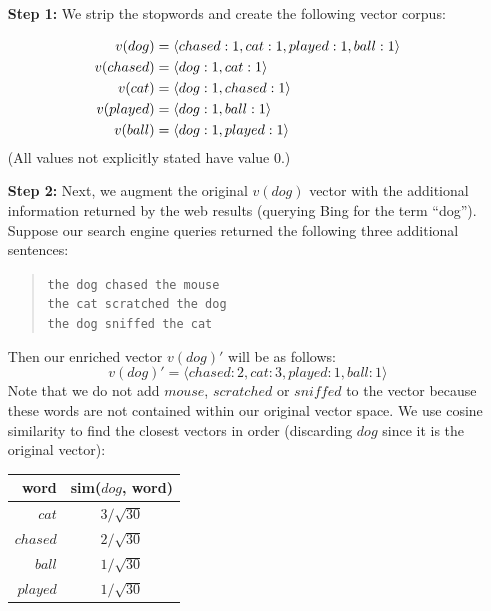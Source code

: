 \documentclass{article}
\begin{document}
\begin{enumerate}

\item[{\bf Step 1:}]
We strip the stopwords and create the following vector corpus:

\begin{align}
    v(dog) &=  \langle chased: 1, cat: 1, played: 1, ball: 1\rangle \notag\\ %
    v(chased)& = \langle dog: 1, cat: 1\rangle \notag\\  %
    v(cat) &=  \langle dog: 1, chased: 1\rangle \notag\\  %
    v(played) &=  \langle dog: 1, ball: 1\rangle \notag\\ %
    v(ball)& =  \langle dog: 1, played: 1\rangle  \notag  %
\end{align}
(All values not explicitly stated have value 0.)

\item[{\bf Step 2:}]
Next, we augment the original $v(dog)$ vector with the additional information returned by the web results (querying Bing for the term ``dog'').
Suppose our search engine queries returned the following three additional sentences:
\begin{quote}
\texttt{the dog chased the mouse\\ the cat scratched the dog\\ the dog sniffed the cat}
\end{quote}
Then our enriched vector $v(dog)'$ will be as follows:
$$
    v(dog)' = \langle chased: 2, cat: 3, played: 1, ball: 1\rangle %
$$
Note that we do not add $mouse$, $scratched$ or $sniffed$ to the vector because these words are not contained within our original vector space.
We use cosine similarity to find the closest vectors in order (discarding $dog$ since it is the original vector):

\begin{center}
\begin{tabular}{|r|c|}
\hline
\bf{word} & \bf{sim($dog$, word)}\\
\hline
$cat$ & $3 / \sqrt{30}$\\
$chased$ & $2 / \sqrt{30}$\\
$ball$ & $1 / \sqrt{30}$\\
$played$ & $1 / \sqrt{30}$\\
\hline
\end{tabular}
\end{center}



\end{enumerate}
\end{document}

